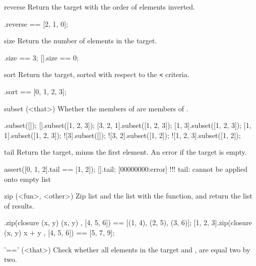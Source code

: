 \begin{urbiscriptapi}
\item[reverse]
Return the target with the order of elements inverted.

\begin{urbiassert}
[0, 1, 2].reverse == [2, 1, 0];
\end{urbiassert}

\item[size]
Return the number of elements in the target.

\begin{urbiassert}
[0, 1, 2].size == 3;
[].size == 0;
\end{urbiassert}

\item[sort]
Return the target, sorted with respect to the \lstinline|<| criteria.

\begin{urbiassert}
[1, 0, 3, 2].sort == [0, 1, 2, 3];
\end{urbiassert}

\item[subset](<that>)
  Whether the members of \this are members of .

\begin{urbiassert}
[].subset([]);
[].subset([1, 2, 3]);
[3, 2, 1].subset([1, 2, 3]);
[1, 3].subset([1, 2, 3]);
[1, 1].subset([1, 2, 3]);
![3].subset([]);
![3, 2].subset([1, 2]);
![1, 2, 3].subset([1, 2]);
\end{urbiassert}

\item[tail]
  Return the target, minus the first element. An error if the target
  is empty.

\begin{urbiscript}
assert([0, 1, 2].tail == [1, 2]);
[].tail;
[00000000:error] !!! tail: cannot be applied onto empty list
\end{urbiscript}

\item[zip](<fun>, <other>)
  Zip \this list and the  list with the  function, and
  return the list of results.

\begin{urbiassert}
[1, 2, 3].zip(closure (x, y) { (x, y) }, [4, 5, 6])
       == [(1, 4), (2, 5), (3, 6)];
[1, 2, 3].zip(closure (x, y) { x + y }, [4, 5, 6])
       == [5, 7, 9];
\end{urbiassert}

\item['=='](<that>)%
Check whether all elements in the target and , are
equal two by two.


\end{urbiscriptapi}
